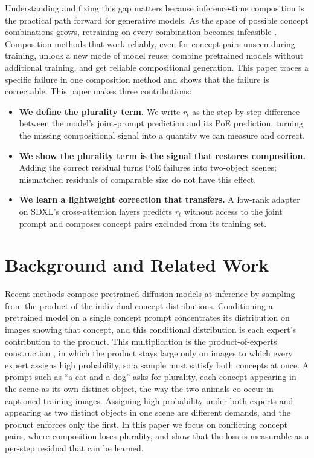 \documentclass{article} %
\begin{document}
Understanding and fixing this gap matters because inference-time composition is the practical path forward for generative models. As the space of possible concept combinations grows, retraining on every combination becomes infeasible \citep{du2024compositional}. Composition methods that work reliably, even for concept pairs unseen during training, unlock a new mode of model reuse: combine pretrained models without additional training, and get reliable compositional generation. This paper traces a specific failure in one composition method and shows that the failure is correctable. This paper makes three contributions:
\begin{itemize}
    \item \textbf{We define the plurality term.} We write $r_t$ as the step-by-step difference between the model's joint-prompt prediction and its PoE prediction, turning the missing compositional signal into a quantity we can measure and correct.
    \item \textbf{We show the plurality term is the signal that restores composition.} Adding the correct residual turns PoE failures into two-object scenes; mismatched residuals of comparable size do not have this effect.
    \item \textbf{We learn a lightweight correction that transfers.} A low-rank adapter on SDXL's cross-attention layers predicts $r_t$ without access to the joint prompt and composes concept pairs excluded from its training set.
\end{itemize}

\section{Background and Related Work}
\label{sec:background}

Recent methods compose pretrained diffusion models at inference by sampling from the product of the individual concept distributions. Conditioning a pretrained model on a single concept prompt concentrates its distribution on images showing that concept, and this conditional distribution is each expert's contribution to the product. This multiplication is the product-of-experts construction \citep{liu2022compositional, zhang2025product}, in which the product stays large only on images to which every expert assigns high probability, so a sample must satisfy both concepts at once. A prompt such as ``a cat and a dog'' asks for plurality, each concept appearing in the scene as its own distinct object, the way the two animals co-occur in captioned training images. Assigning high probability under both experts and appearing as two distinct objects in one scene are different demands, and the product enforces only the first. In this paper we focus on conflicting concept pairs, where composition loses plurality, and show that the loss is measurable as a per-step residual that can be learned.
\end{document}
